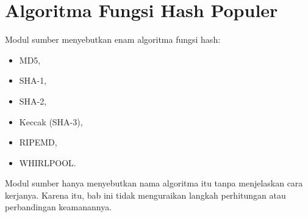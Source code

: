 \section{Algoritma Fungsi Hash Populer}
\label{sec:algoritma-hash}

Modul sumber menyebutkan enam algoritma fungsi hash:
\begin{itemize}
    \item MD5,
    \item SHA-1,
    \item SHA-2,
    \item Keccak (SHA-3),
    \item RIPEMD,
    \item WHIRLPOOL.
\end{itemize}

Modul sumber hanya menyebutkan nama algoritma itu tanpa menjelaskan cara
kerjanya. Karena itu, bab ini tidak menguraikan langkah perhitungan atau
perbandingan keamanannya.

